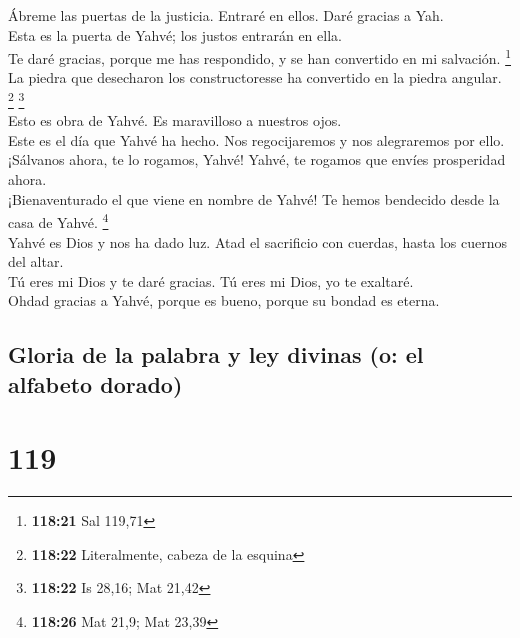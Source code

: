  Ábreme las puertas de la justicia. Entraré en ellos.
Daré gracias a Yah.\\
 Esta es la puerta de Yahvé; los justos entrarán en
ella.\\
 Te daré gracias, porque me has respondido, y se han
convertido en mi salvación. \footnote{\textbf{118:21} Sal 119,71}\\
 La piedra que desecharon los constructoresse ha
convertido en la piedra angular. \footnote{\textbf{118:22} Literalmente,
  cabeza de la esquina} \footnote{\textbf{118:22} Is 28,16; Mat 21,42}\\
 Esto es obra de Yahvé. Es maravilloso a nuestros ojos.\\
 Este es el día que Yahvé ha hecho. Nos regocijaremos y
nos alegraremos por ello.\\
 ¡Sálvanos ahora, te lo rogamos, Yahvé! Yahvé, te rogamos
que envíes prosperidad ahora.\\
 ¡Bienaventurado el que viene en nombre de Yahvé! Te
hemos bendecido desde la casa de Yahvé. \footnote{\textbf{118:26} Mat
  21,9; Mat 23,39}\\
 Yahvé es Dios y nos ha dado luz. Atad el sacrificio con
cuerdas, hasta los cuernos del altar.\\
 Tú eres mi Dios y te daré gracias. Tú eres mi Dios, yo
te exaltaré.\\
 Ohdad gracias a Yahvé, porque es bueno, porque su bondad
es eterna.

\hypertarget{gloria-de-la-palabra-y-ley-divinas-o-el-alfabeto-dorado}{%
\subsection{Gloria de la palabra y ley divinas (o: el alfabeto
dorado)}\label{gloria-de-la-palabra-y-ley-divinas-o-el-alfabeto-dorado}}

\hypertarget{section-116}{%
\section{119}\label{section-116}}

